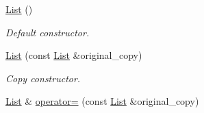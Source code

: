 \begin{DoxyCompactItemize}
\item 
\hypertarget{class_data_structures_1_1_list_aa063066442a5e28b3c40d0b1206ace35}{\hyperlink{class_data_structures_1_1_list_aa063066442a5e28b3c40d0b1206ace35}{List} ()}\label{class_data_structures_1_1_list_aa063066442a5e28b3c40d0b1206ace35}

\begin{DoxyCompactList}\small\item\em Default constructor. \end{DoxyCompactList}\item 
\hyperlink{class_data_structures_1_1_list_abafec4707d1b0b452539afb5acabe1da}{List} (const \hyperlink{class_data_structures_1_1_list}{List} \&original\-\_\-copy)
\begin{DoxyCompactList}\small\item\em Copy constructor. \end{DoxyCompactList}\item 
\hypertarget{class_data_structures_1_1_list_a7faf28804c9d17c301ee072c7dce005b}{\hyperlink{class_data_structures_1_1_list}{List} \& \hyperlink{class_data_structures_1_1_list_a7faf28804c9d17c301ee072c7dce005b}{operator=} (const \hyperlink{class_data_structures_1_1_list}{List} \&original\-\_\-copy)}\label{class_data_structures_1_1_list_a7faf28804c9d17c301ee072c7dce005b}


\end{DoxyCompactItemize}
